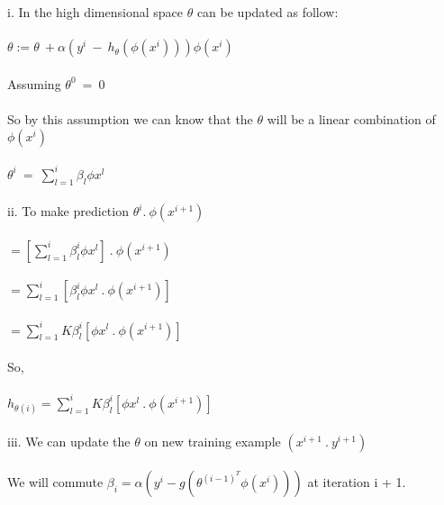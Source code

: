 \newcommand\tab[1][1cm]{\hspace*{#1}}
\begin{answer} 
\\ \\
i. In the high dimensional space $\theta$ can be updated as follow:  \\ \\
\tab[3cm]$\theta:=\theta \ + \alpha(y^i \ - \ h_\theta( \phi(x^i) ))\phi(x^i)$ \\ \\
Assuming $\theta^0 \ = \ 0$ \\ \\
So by this assumption we can know that the $\theta$ will be a linear combination of $\phi(x^i)$  \\ \\
\tab[3cm]$\theta^i \ = \ \sum_{l=1}^i \beta_l \phi x^l$ \\ \\
ii. To make prediction $\theta^i. \ \phi(x^{i+1})$ \\ \\
\tab[3cm]$=  [\sum_{l=1}^i \beta_l^i \phi x^l] \ . \ \phi(x^{i+1})$ \\ \\
\tab[3cm]$=  \sum_{l=1}^i [\beta_l^i \phi x^l \ . \ \phi(x^{i+1})]$ \\ \\
\tab[3cm]$=  \sum_{l=1}^i K \beta_l^i [\phi x^l \ . \ \phi(x^{i+1})]$ \\ \\
So, \\ \\
\tab[2cm]$h_{\theta(i)}=  \sum_{l=1}^i K \beta_l^i [\phi x^l \ . \ \phi(x^{i+1})]$ \\ \\
iii. We can update the $\theta$ on new training example $(x^{i+1}\ . \ y^{i+1})$\\ \\
We will  commute $\beta_i = \alpha(y^i - g(\theta^{(i-1)^T}\phi(x^i)))$ at iteration i + 1. \\ \\
\end{answer}

